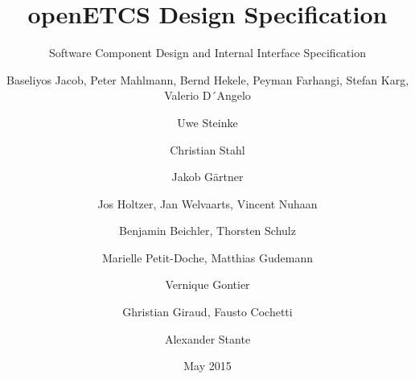 \documentclass{template/openetcs_report}
\begin{document}
\frontmatter
{}

\newcommand{\define}[1]{\index{#1}\emph{#1}}







\title{openETCS Design Specification}

\subtitle{Software Component Design and Internal Interface Specification}

\date{May 2015}








\author{Baseliyos Jacob, Peter Mahlmann, Bernd Hekele, Peyman Farhangi, Stefan Karg, Valerio D´Angelo}

\author{Uwe Steinke}

\author{Christian Stahl}

\author{Jakob Gärtner}

\author{Jos Holtzer, Jan Welvaarts, Vincent Nuhaan}

\author{Benjamin Beichler, Thorsten Schulz}

\author{Marielle Petit-Doche, Matthias Gudemann}

\author{Vernique Gontier}

\author{Ghristian Giraud, Fausto Cochetti}

\author{Alexander Stante}
\end{document}

